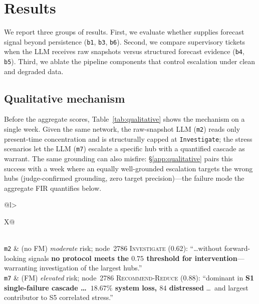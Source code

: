 \section{Results}
\label{sec:results}

We report three groups of results. First, we evaluate whether
\fmname{} supplies forecast signal beyond persistence
(\texttt{b1}, \texttt{b3}, \texttt{b6}). Second, we compare
supervisory tickets when the LLM receives raw snapshots versus
structured forecast evidence (\texttt{b4}, \texttt{b5}). Third, we
ablate the pipeline components that control escalation under clean
and degraded data.

\subsection{Qualitative mechanism}
Before the aggregate scores, Table~\ref{tab:qualitative} shows the
mechanism on a single week. Given the same network, the raw-snapshot
LLM (\texttt{m2}) reads only present-time concentration and is
structurally capped at \texttt{Investigate}; the \fmname{} stress
scenarios let the LLM (\texttt{m7}) escalate a specific hub with a
quantified cascade as warrant. The same grounding can also misfire:
\S\ref{app:qualitative} pairs this success with a week where an
equally well-grounded escalation targets the wrong hubs (judge-confirmed
grounding, zero target precision)---the failure mode the aggregate FIR
quantifies below.

\begin{table}[t]
\centering\small
\setlength{\tabcolsep}{4pt}
\begin{tabularx}{\linewidth}{@{}l>{\raggedright\arraybackslash}X@{}}
\toprule
{}\\
\midrule
\texttt{m2} & (no FM) \emph{moderate} risk; node~2786
\textsc{Investigate} ($0.62$): ``\dots without forward-looking signals
\textbf{no protocol meets the $0.75$ threshold for intervention}---warranting
investigation of the largest hubs.'' \\
\addlinespace
\texttt{m7} & (FM) \emph{elevated} risk; node~2786
\textsc{Recommend-Reduce} ($0.88$): ``dominant in \textbf{S1
single-failure cascade \dots\ $18.67\%$ system loss, $84$ distressed} \dots\
and largest contributor to S5 correlated stress.'' \\
\bottomrule
\end{tabularx}
\caption{A single week, with and without forecaster grounding (verbatim
ticket excerpts; one of three consistency runs). Without a forward signal
the LLM is structurally capped at \textsc{Investigate}; the \fmname{}'s
stress scenarios license a quantified escalation. The same grounding can
equally warrant a confident-but-wrong escalation---the over-intervention
case (2025-04-28) and full tickets are in \S\ref{app:qualitative}.}
\label{tab:qualitative}
\end{table}

